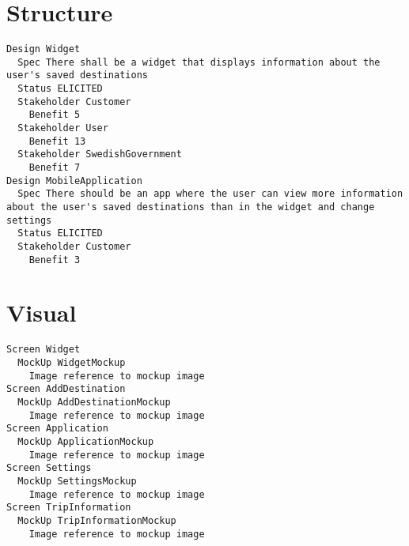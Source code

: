 \begin{lstlisting}

\end{lstlisting}


       \section{Structure}


\begin{lstlisting}
Design Widget
  Spec There shall be a widget that displays information about the user's saved destinations
  Status ELICITED
  Stakeholder Customer
    Benefit 5
  Stakeholder User
    Benefit 13
  Stakeholder SwedishGovernment
    Benefit 7
Design MobileApplication
  Spec There should be an app where the user can view more information about the user's saved destinations than in the widget and change settings
  Status ELICITED
  Stakeholder Customer
    Benefit 3

\end{lstlisting}
    
        
       \section{Visual}


\begin{lstlisting}
Screen Widget
  MockUp WidgetMockup
    Image reference to mockup image
Screen AddDestination
  MockUp AddDestinationMockup
    Image reference to mockup image
Screen Application
  MockUp ApplicationMockup
    Image reference to mockup image
Screen Settings
  MockUp SettingsMockup
    Image reference to mockup image
Screen TripInformation
  MockUp TripInformationMockup
    Image reference to mockup image

\end{lstlisting}